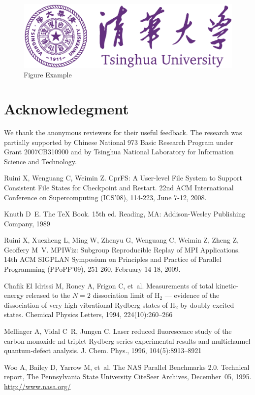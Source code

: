 \documentclass{ics}
\begin{document}
\begin{figure}
  \centering
  \includegraphics[width=.8\linewidth]{thu-whole-logo}
  \caption{Figure Example}
  \label{fig:example}
\end{figure}

\section*{Acknowledegment}
\label{sec:acknowledegment}
We thank the anonymous reviewers for their useful feedback. The research was
partially supported by Chinese National 973 Basic Research Program under Grant
2007CB310900 and by Tsinghua National Laboratory for Information Science and
Technology. 

% 
% 
% 

\begin{thebibliography}{99}

 Ruini X, Wenguang C, Weimin Z. CprFS: A User-level File System
  to Support Consistent File States for Checkpoint and Restart. 22nd ACM
  International Conference on Supercomputing (ICS'08), 114-223, June 7-12, 2008.

 Knuth D~E. The {\TeX} Book. 15th ed. Reading, MA: Addison-Wesley
  Publishing Company, 1989

 Ruini X, Xuezheng L, Ming W, Zhenyu G, Wenguang C, Weimin Z,
  Zheng Z, Geoffery M~V. MPIWiz: Subgroup Reproducible Replay of MPI
  Applications. 14th ACM SIGPLAN Symposium on Principles and Practice of
  Parallel Programming (PPoPP'09), 251-260, February 14-18, 2009.

 {Chafik El Idrissi} M, Roney A, Frigon C, et~al. Measurements
  of total kinetic-energy released to the {$N=2$} dissociation limit of {H}$_2$
  --- evidence of the dissociation of very high vibrational {R}ydberg states of
  {H}$_2$ by doubly-excited states. Chemical Physics Letters, 1994,
  224(10):260--266

 Mellinger A, Vidal C~R, Jungen C.  Laser reduced
  fluorescence study of the carbon-monoxide nd triplet {R}ydberg
  series-experimental results and multichannel quantum-defect analysis.
  J. Chem. Phys., 1996, 104(5):8913--8921

 Woo A, Bailey D, Yarrow M, et~al. The {NAS} Parallel Benchmarks
  2.0. Technical report, The Pennsylvania State University CiteSeer Archives,
  December~05, 1995. \url{http://www.nasa.org/}
\end{thebibliography}
\end{document}
